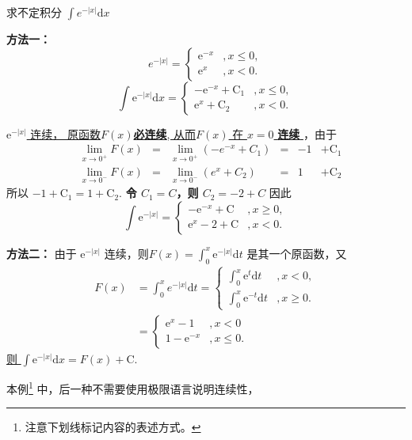 \documentclass{beaulivre}
\begin{document}
\begin{example}
    求不定积分 $\int e ^{-|x|} \mathrm{d} x$

    \textbf{方法一：}
    \[
        e^{-|x|} = \left\{
            \begin{array}{rl}
                \mathrm{e} ^{-x} &, x \leq 0, \\
                \mathrm{e} ^x    &, x < 0.
            \end{array}
        \right.
    \]
    \[
        \int \mathrm{e} ^{-|x|} \mathrm{d} x = \left\{
            \begin{array}{rl}
                - \mathrm{e} ^{-x} + \mathrm{C_1} &, x \leq 0, \\
                  \mathrm{e} ^x    + \mathrm{C_2} &, x < 0.
            \end{array}
        \right.
    \]

    \uline{
        $\mathrm{e}^{-|x|}$ 连续，
        原函数$F(x)$\textbf{必连续}, 从而$F(x)$
        在 $x = 0$ \textbf{连续}
    }，由于
    \begin{align*}
        &\lim_{x \to 0^+} F(x) &= &\lim_{x \to 0^+}(-e^{-x} + C_{1})&=& -1& +\mathrm{C_{1}}  \\
        &\lim_{x \to 0^-} F(x) &= &\lim_{x \to 0^-}(e^{x} + C_{2})  &=&  1& +\mathrm{C_{2}} 
    \end{align*}
    所以 $ -1 + \mathrm{C_1} = 1 + \mathrm{C_2}$.
    \textbf{令 $C_1 = C$，则 $C_2 = -2 + C$} 因此
    \[
        \int \mathrm{e}^{-|x|} = \left\{
            \begin{array}{rl}
                - \mathrm{e}^{-x} + \mathrm{C} &, x \geq 0, \\
                  \mathrm{e}^{ x} - 2 + \mathrm{C} &, x < 0.
            \end{array}
        \right.
    \]

    \begin{center}
    \raisebox{0.5ex}{\rule{\textwidth}{0.3pt}}
    \end{center}

    \textbf{方法二：}
    由于 $\mathrm{e}^{-|x|}$ 连续，则$F(x) = \int_{0}^{x} \mathrm{e}^{-|x|} \mathrm{d} t$
    是其一个原函数，又
    \begin{align*}
        F(x) &= \int_{0}^{x} e^{-|x|} \mathrm{d} t = 
        \left\{
            \begin{array}{rl}
                \int_{0}^{x} \mathrm{e}^t    \mathrm{d} t &, x < 0, \\
                \int_{0}^{x} \mathrm{e}^{-t} \mathrm{d} t &, x \geq 0.
            \end{array}
        \right. \\
        &= \left\{
            \begin{array}{rl}
                \mathrm{e}^x - 1 &, x < 0 \\
                1 - \mathrm{e}^{-x} &, x \leq 0.
            \end{array}
        \right.
    \end{align*}
    \underline{则 $\int \mathrm{e}^{-|x|} \mathrm{d} x = F(x) + \mathrm{C}$}.
\end{example}
本例\footnote{注意下划线标记内容的表述方式。}
中，后一种不需要使用极限语言说明连续性，
\end{document}
